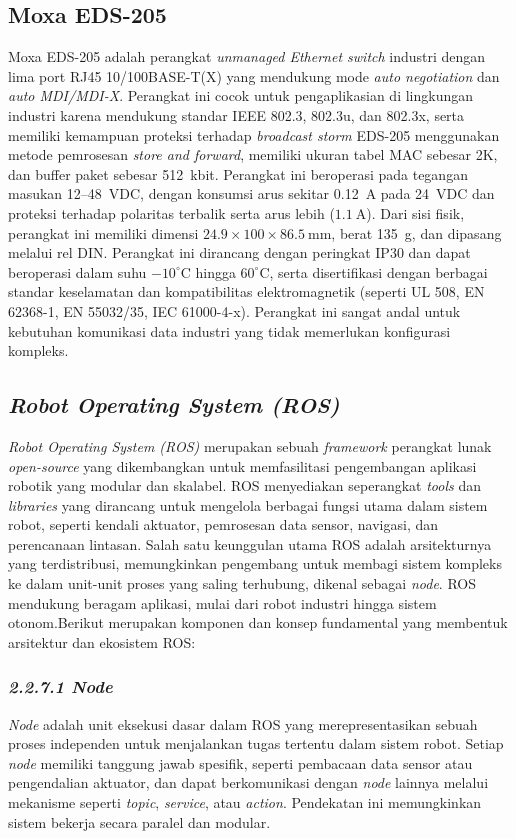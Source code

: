 \subsection{Moxa EDS-205}

Moxa EDS-205 adalah perangkat \emph{unmanaged Ethernet switch} industri dengan lima port RJ45 10/100BASE-T(X) yang mendukung mode \emph{auto negotiation} dan \emph{auto MDI/MDI-X}. Perangkat ini cocok untuk pengaplikasian di lingkungan industri karena mendukung standar IEEE 802.3, 802.3u, dan 802.3x, serta memiliki kemampuan proteksi terhadap \emph{broadcast storm} EDS-205 menggunakan metode pemrosesan \emph{store and forward}, memiliki ukuran tabel MAC sebesar 2K, dan buffer paket sebesar 512~kbit. Perangkat ini beroperasi pada tegangan masukan 12--48~VDC, dengan konsumsi arus sekitar 0.12~A pada 24~VDC dan proteksi terhadap polaritas terbalik serta arus lebih (\(1.1~\text{A}\)). Dari sisi fisik, perangkat ini memiliki dimensi \(24.9 \times 100 \times 86.5~\text{mm}\), berat 135~g, dan dipasang melalui rel DIN. Perangkat ini dirancang dengan peringkat IP30 dan dapat beroperasi dalam suhu \(-10^\circ\text{C}\) hingga \(60^\circ\text{C}\), serta disertifikasi dengan berbagai standar keselamatan dan kompatibilitas elektromagnetik (seperti UL 508, EN 62368-1, EN 55032/35, IEC 61000-4-x). Perangkat ini sangat andal untuk kebutuhan komunikasi data industri yang tidak memerlukan konfigurasi kompleks.

\subsection{\emph{Robot Operating System (ROS)}}

\emph{Robot Operating System (ROS)} merupakan sebuah \emph{framework} perangkat lunak \emph{open-source} yang dikembangkan untuk memfasilitasi pengembangan aplikasi robotik yang modular dan skalabel. ROS menyediakan seperangkat \emph{tools} dan \emph{libraries} yang dirancang untuk mengelola berbagai fungsi utama dalam sistem robot, seperti kendali aktuator, pemrosesan data sensor, navigasi, dan perencanaan lintasan. Salah satu keunggulan utama ROS adalah arsitekturnya yang terdistribusi, memungkinkan pengembang untuk membagi sistem kompleks ke dalam unit-unit proses yang saling terhubung, dikenal sebagai \emph{node}. ROS mendukung beragam aplikasi, mulai dari robot industri hingga sistem otonom.Berikut merupakan komponen dan konsep fundamental yang membentuk arsitektur dan ekosistem ROS:

\subsubsection{\emph{2.2.7.1 Node}}
\emph{Node} adalah unit eksekusi dasar dalam ROS yang merepresentasikan sebuah proses independen untuk menjalankan tugas tertentu dalam sistem robot. Setiap \emph{node} memiliki tanggung jawab spesifik, seperti pembacaan data sensor atau pengendalian aktuator, dan dapat berkomunikasi dengan \emph{node} lainnya melalui mekanisme seperti \emph{topic}, \emph{service}, atau \emph{action}. Pendekatan ini memungkinkan sistem bekerja secara paralel dan modular.

